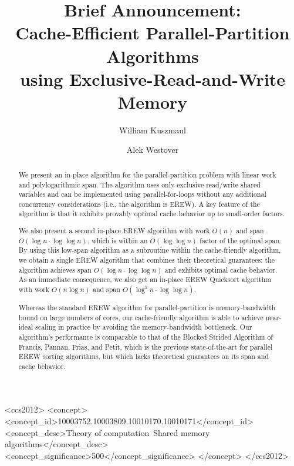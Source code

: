 \documentclass[sigconf]{acmart}
\theoremstyle{remark}
\theoremstyle{remark}
\begin{document}
\fancyhead{}


\title{Brief Announcement: \\Cache-Efficient Parallel-Partition Algorithms \\using Exclusive-Read-and-Write Memory}

\author{William Kuszmaul}

\author{Alek Westover}

\renewcommand{\shortauthors}{William Kuszmaul and Alek Westover}

\begin{abstract}
We present an in-place algorithm for the parallel-partition problem
with linear work and polylogarithmic span. The algorithm uses only
exclusive read/write shared variables and can be implemented using
parallel-for-loops without any additional concurrency considerations
(i.e., the algorithm is EREW). A key feature of the algorithm is that
it exhibits provably optimal cache behavior up to small-order factors.

We also present a second in-place EREW algorithm with work $O(n)$ and span
$O(\log n \cdot \log \log n)$, which is within an $O(\log\log n)$ factor of the
optimal span. By using this low-span algorithm as a subroutine within the
cache-friendly algorithm, we obtain a single EREW algorithm that combines their
theoretical guarantees: the algorithm achieves span $O(\log n \cdot \log \log
n)$ and exhibits optimal cache behavior. As an immediate consequence, we also
get an in-place EREW Quicksort algorithm with work $O(n \log n)$ and span
$O(\log^2 n \cdot \log \log n)$.

Whereas the standard EREW algorithm for parallel-partition is
memory-bandwidth bound on large numbers of cores, our cache-friendly
algorithm is able to achieve near-ideal scaling in practice by
avoiding the memory-bandwidth bottleneck. Our algorithm's performance
is comparable to that of the Blocked Strided Algorithm of Francis,
Pannan, Frias, and Petit, which is the previous state-of-the-art for
parallel EREW sorting algorithms, but which lacks theoretical
guarantees on its span and cache behavior.
\end{abstract}

\begin{CCSXML}
<ccs2012>
   <concept>
       <concept_id>10003752.10003809.10010170.10010171</concept_id>
       <concept_desc>Theory of computation~Shared memory algorithms</concept_desc>
       <concept_significance>500</concept_significance>
       </concept>
 </ccs2012>
\end{CCSXML}
\end{document}
